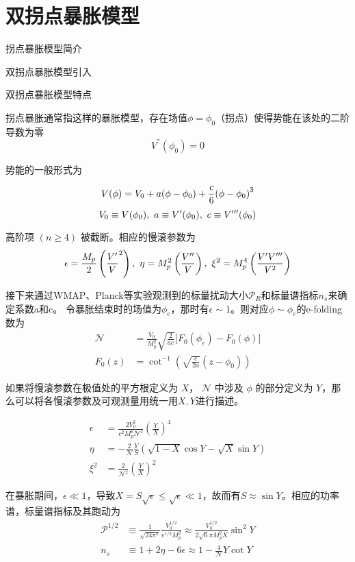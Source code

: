 \section{双拐点暴胀模型}

拐点暴胀模型简介

双拐点暴胀模型引入

双拐点暴胀模型特点

拐点暴胀通常指这样的暴胀模型，存在场值$\phi=\phi_0$（拐点）使得势能在该处的二阶导数为零
\begin{equation}
    V^{\dprime}(\phi_0) = 0
\end{equation}

势能的一般形式为

\begin{equation}
    \label{eq:inf_potential}
    V (\phi)=V_0+a (\phi-\phi_0)+\frac{c}{6}{\left(\phi-\phi_0\right)}^3\\
\end{equation}
\begin{equation}
    V_0\equiv V (\phi_0),\ a\equiv V' (\phi_0),\ c\equiv V^{\tprime} (\phi_0) 
\end{equation}

高阶项 $(n \geq 4)$ 被截断。相应的慢滚参数为
\begin{equation}
    \label{eq:psrp}
    \epsilon = \frac{M_p}{2}\left(\frac{V'}{V}^2\right),\ \eta=M^2_p
    \left(\frac{V^{\dprime}}{V}\right),\ \xi^2=M^4_p\left(\frac{V'V^{\tprime}}{V^2}\right)
\end{equation}

接下来通过WMAP、Planck等实验观测到的标量扰动大小$\mathcal{P}_R$和标量谱指标$n_s$来确定系数a和c。
令暴胀结束时的场值为$\phi_e$，那时有$\epsilon\sim
1$。则对应$\phi\sim\phi_e$的e-folding数为
\begin{align}
    \label{eq:e-folding}
    \mathcal{N} &= \frac{V_0}{M^2_p}\sqrt{\frac{2}{ac}}\lbrack
    F_0(\phi_e)-F_0(\phi)\rbrack \\
    F_0(z) &= \cot^{-1}\left(\sqrt{\frac{c}{2a}}(z-\phi_0)\right)
\end{align}

如果将慢滚参数在极值处的平方根定义为 $X$， $\mathcal{N}$ 中涉及 $\phi$
的部分定义为 $Y$，那么可以将各慢滚参数及可观测量用统一用$X,Y$进行描述。

\begin{align}
    \epsilon &=
    \frac{2V_0^2}{c^2M_p^6\mathcal{N}^4} {\left(\frac{Y}{X} \right)}^4 \\
    \eta &=
    -\frac{2}{\mathcal{N}}\frac{Y}{S}\left(\sqrt{1-X}\cos Y-\sqrt{X}\sin
    Y\right)\\
    \xi^2 &= \frac{2}{\mathcal{N}^2}{\left(\frac{Y}{X}\right)}^2
\end{align}

在暴胀期间，$\epsilon \ll 1$，导致$X=S\sqrt{\epsilon}\leq\sqrt{\epsilon}\ll
1$，故而有$S\approx \sin Y$。相应的功率谱，标量谱指标及其跑动为
\begin{align}
    \mathcal{P}^{1/2}&\equiv\frac{1}{\sqrt{24\pi^2}}\frac{V_0^{1/2}}{\epsilon^{1/2}M_p^2}
    \approx\frac{V_0^{1/2}}{2\sqrt{6}\pi M_p^2 X}\sin^2Y\\
    n_s&\equiv1+2\eta-6\epsilon\approx1-\frac{4}{\mathcal{N}}Y\cot Y\\
\end{align}
